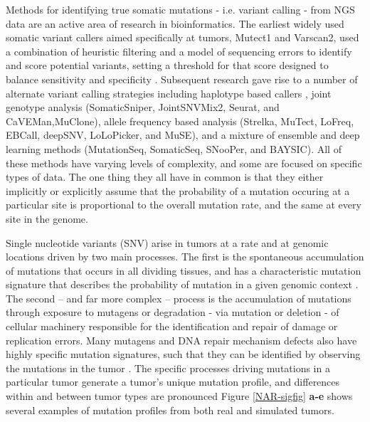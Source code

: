 \documentclass[a4,center,fleqn]{NAR}
\begin{document}
Methods for identifying true somatic mutations - i.e. variant calling -  from NGS data are an active area of research in bioinformatics.
The earliest widely used somatic variant callers aimed specifically at tumors, Mutect1 and Varscan2, used a combination of heuristic filtering and a model of sequencing errors to identify and score potential variants, setting a threshold for that score designed to balance sensitivity and specificity \citep{Koboldt2012,Cibulskis2013}.
Subsequent research gave rise to a number of alternate variant calling strategies including haplotype based callers \citep{Garrison2012},
joint genotype analysis (SomaticSniper, JointSNVMix2, Seurat, and CaVEMan,MuClone)\citep{Larson2012,Roth2012a,Christoforides2013,Jones2016,Dorri2019}, allele frequency based analysis (Strelka, MuTect, LoFreq, EBCall, deepSNV, LoLoPicker, and MuSE)\citep{Saunders2012,Wilm2012,Shiraishi2013b,Gerstung2012,Carrot-Zhang2017,Fan2016}, and a mixture of ensemble and deep learning methods (MutationSeq, SomaticSeq, SNooPer, and BAYSIC).
All of these methods have varying levels of complexity, and some are focused on specific types of data.
The one thing they all have in common is that they either implicitly or explicitly assume that the probability of a mutation occuring at a particular site is proportional to the overall mutation rate, and the same at every site in the genome.

Single nucleotide variants (SNV) arise in tumors at a rate and at genomic locations driven by two main processes. 
The first is the spontaneous accumulation of mutations that occurs in all dividing tissues, and has a characteristic mutation signature that describes the probability of mutation in a given genomic context \citep{Nik-Zainal2012a,Alexandrov2015,Lee-Six2018}. 
The second -- and far more complex -- process is the accumulation of mutations through exposure to mutagens or degradation - via mutation or deletion - of cellular machinery responsible for the identification and repair of damage or replication errors. 
Many mutagens and DNA repair mechanism defects also have highly specific mutation signatures, such that they can be identified by observing the mutations in the tumor \citep{Alexandrov2013a,Helleday2014a,Nik-Zainal2016,Kandoth2013,Alexandrov2016}.
The specific processes driving mutations in a particular tumor generate a tumor's unique mutation profile, and differences within and between tumor types are pronounced \cite{Stephens2005, Burrell2013a, Nakamura2015, Witkiewicz2015, Kumar2016}
Figure \ref{NAR-sigfig} \textbf{a-e} shows several examples of mutation profiles from both real and simulated tumors.
\end{document}
